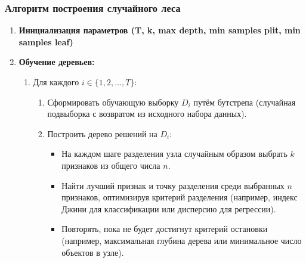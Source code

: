 \subsubsection*{Алгоритм построения случайного леса}

\begin{enumerate}
    \item \textbf{Инициализация параметров (T, k, max depth, min samples plit, min samples leaf)}

    \item \textbf{Обучение деревьев:}
          \begin{enumerate}
              \item Для каждого \(i \in \{1, 2, \dots, T\}\):
                    \begin{enumerate}
                        \item Сформировать обучающую выборку \(D_i\) путём бутстрепа (случайная подвыборка с возвратом из исходного набора данных).
                        \item Построить дерево решений на \(D_i\):
                              \begin{itemize}
                                  \item На каждом шаге разделения узла случайным образом выбрать \(k\) признаков из общего числа \(n\).
                                  \item Найти лучший признак и точку разделения среди выбранных \(n\) признаков, оптимизируя критерий разделения (например, индекс Джини для классификации или дисперсию для регрессии).
                                  \item Повторять, пока не будет достигнут критерий остановки (например, максимальная глубина дерева или минимальное число объектов в узле).
                              \end{itemize}
                    \end{enumerate}
          \end{enumerate}


\end{enumerate}
